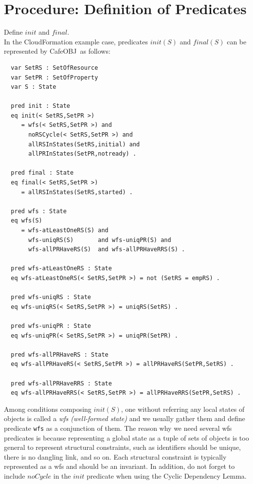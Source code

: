 \documentclass[12pt]{report}
\newcommand{\cafeobj}{{\sf CafeOBJ}~}
\begin{document}
\section{Procedure: Definition of Predicates}
\label{sec:support}
 Define $init$ and $final$. \\ In the
CloudFormation example case, predicates $init(S)$ and $final(S)$ can
be represented by \cafeobj as follows:
\small
\begin{verbatim}
  var SetRS : SetOfResource
  var SetPR : SetOfProperty
  var S : State

  pred init : State
  eq init(< SetRS,SetPR >)
     = wfs(< SetRS,SetPR >) and
       noRSCycle(< SetRS,SetPR >) and
       allRSInStates(SetRS,initial) and 
       allPRInStates(SetPR,notready) .

  pred final : State
  eq final(< SetRS,SetPR >)
     = allRSInStates(SetRS,started) .

  pred wfs : State
  eq wfs(S)
     = wfs-atLeastOneRS(S) and
       wfs-uniqRS(S)       and wfs-uniqPR(S) and 
       wfs-allPRHaveRS(S)  and wfs-allPRHaveRRS(S) .

  pred wfs-atLeastOneRS : State
  eq wfs-atLeastOneRS(< SetRS,SetPR >) = not (SetRS = empRS) .

  pred wfs-uniqRS : State
  eq wfs-uniqRS(< SetRS,SetPR >) = uniqRS(SetRS) .

  pred wfs-uniqPR : State
  eq wfs-uniqPR(< SetRS,SetPR >) = uniqPR(SetPR) .

  pred wfs-allPRHaveRS : State
  eq wfs-allPRHaveRS(< SetRS,SetPR >) = allPRHaveRS(SetPR,SetRS) .

  pred wfs-allPRHaveRRS : State
  eq wfs-allPRHaveRRS(< SetRS,SetPR >) = allPRHaveRRS(SetPR,SetRS) .
\end{verbatim}
\normalsize
Among conditions composing $init(S)$, one without referring any local
states of objects is called a {\it wfs (well-formed state)} and we
usually gather them and define predicate {\tt wfs} as a conjunction of
them. The reason why we need several wfs predicates
is because representing a global state as a tuple of sets of
objects is too general to represent structural constraints, such as
identifiers should be unique, there is no dangling link, and so on. Each
structural constraint is typically represented as a wfs and should be
an invariant. In addition, do not forget to include $noCycle$
in the $init$ predicate when using the Cyclic
Dependency Lemma.\\
\end{document}
